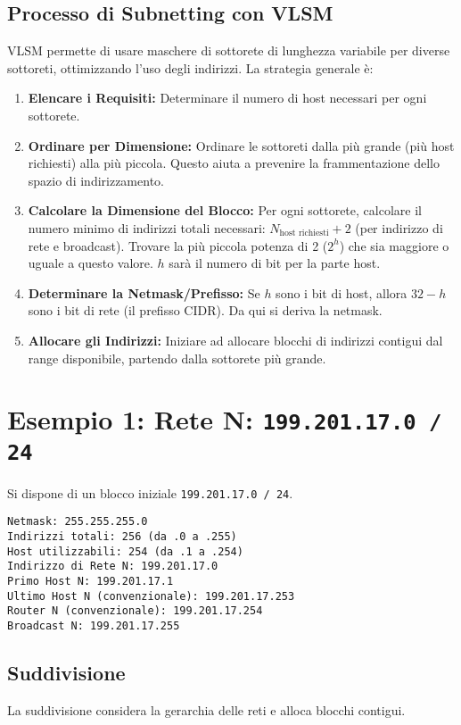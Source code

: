 \subsection{Processo di Subnetting con VLSM}
VLSM permette di usare maschere di sottorete di lunghezza variabile per diverse sottoreti, ottimizzando l'uso degli indirizzi. La strategia generale è:
\begin{enumerate}
    \item \textbf{Elencare i Requisiti:} Determinare il numero di host necessari per ogni sottorete.
    \item \textbf{Ordinare per Dimensione:} Ordinare le sottoreti dalla più grande (più host richiesti) alla più piccola. Questo aiuta a prevenire la frammentazione dello spazio di indirizzamento.
    \item \textbf{Calcolare la Dimensione del Blocco:} Per ogni sottorete, calcolare il numero minimo di indirizzi totali necessari: $N_{\text{host richiesti}} + 2$ (per indirizzo di rete e broadcast). Trovare la più piccola potenza di 2 ($2^h$) che sia maggiore o uguale a questo valore. $h$ sarà il numero di bit per la parte host.
    \item \textbf{Determinare la Netmask/Prefisso:} Se $h$ sono i bit di host, allora $32 - h$ sono i bit di rete (il prefisso CIDR). Da qui si deriva la netmask.
    \item \textbf{Allocare gli Indirizzi:} Iniziare ad allocare blocchi di indirizzi contigui dal range disponibile, partendo dalla sottorete più grande.
\end{enumerate}

\newpage
\section{Esempio 1: Rete N: \texttt{199.201.17.0 / 24}}
Si dispone di un blocco iniziale \texttt{199.201.17.0 / 24}.
\begin{verbatim}
Netmask: 255.255.255.0
Indirizzi totali: 256 (da .0 a .255)
Host utilizzabili: 254 (da .1 a .254)
Indirizzo di Rete N: 199.201.17.0
Primo Host N: 199.201.17.1
Ultimo Host N (convenzionale): 199.201.17.253
Router N (convenzionale): 199.201.17.254
Broadcast N: 199.201.17.255
\end{verbatim}

\subsection{Suddivisione}
La suddivisione considera la gerarchia delle reti e alloca blocchi contigui.

